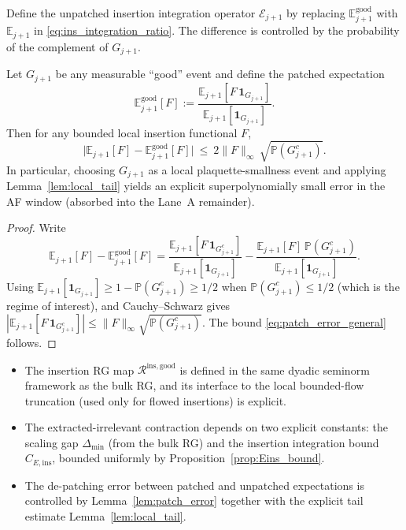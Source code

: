 Define the unpatched insertion integration operator $\mathcal E_{j+1}$ by replacing $\mathbb E^{\mathrm{good}}_{j+1}$ with $\mathbb E_{j+1}$ in \eqref{eq:ins_integration_ratio}.
The difference is controlled by the probability of the complement of $G_{j+1}$.

\begin{lemma}\label{lem:patch_error}
Let $G_{j+1}$ be any measurable ``good'' event and define the patched expectation
\[
\mathbb E^{\mathrm{good}}_{j+1}[F]
:=\frac{\mathbb E_{j+1}[F\,\mathbf 1_{G_{j+1}}]}{\mathbb E_{j+1}[\mathbf 1_{G_{j+1}}]}.
\]
Then for any bounded local insertion functional $F$,
\begin{equation}\label{eq:patch_error_general}
\big|\mathbb E_{j+1}[F]-\mathbb E^{\mathrm{good}}_{j+1}[F]\big|
\ \le\ 2\|F\|_\infty\,\sqrt{\mathbb P(G_{j+1}^c)}.
\end{equation}
In particular, choosing $G_{j+1}$ as a local plaquette-smallness event and applying Lemma~\ref{lem:local_tail}
yields an explicit superpolynomially small error in the AF window (absorbed into the Lane~A remainder).
\end{lemma}

\begin{proof}
Write
\[
\mathbb E_{j+1}[F]-\mathbb E^{\mathrm{good}}_{j+1}[F]
=
\frac{\mathbb E_{j+1}[F\,\mathbf 1_{G_{j+1}^c}]}{\mathbb E_{j+1}[\mathbf 1_{G_{j+1}}]}
-
\frac{\mathbb E_{j+1}[F]\,\mathbb P(G_{j+1}^c)}{\mathbb E_{j+1}[\mathbf 1_{G_{j+1}}]}.
\]
Using $\mathbb E_{j+1}[\mathbf 1_{G_{j+1}}]\ge 1-\mathbb P(G_{j+1}^c)\ge 1/2$ when $\mathbb P(G_{j+1}^c)\le 1/2$ (which is the regime of interest),
and Cauchy--Schwarz gives $|\mathbb E_{j+1}[F\,\mathbf 1_{G_{j+1}^c}]|\le \|F\|_\infty\sqrt{\mathbb P(G_{j+1}^c)}$.
The bound \eqref{eq:patch_error_general} follows.
\end{proof}

\begin{itemize}
\item The insertion RG map $\mathcal R^{\mathrm{ins,good}}$ is defined in the same dyadic seminorm framework as the bulk RG, and its interface to the local bounded-flow truncation (used only for flowed insertions) is explicit.
\item The extracted-irrelevant contraction depends on two explicit constants: the scaling gap $\Delta_{\min}$ (from the bulk RG) and the insertion integration bound $C_{E,\mathrm{ins}}$, bounded uniformly by Proposition~\ref{prop:Eins_bound}.
\item The de-patching error between patched and unpatched expectations is controlled by Lemma~\ref{lem:patch_error} together with the explicit tail estimate Lemma~\ref{lem:local_tail}.
\end{itemize}
